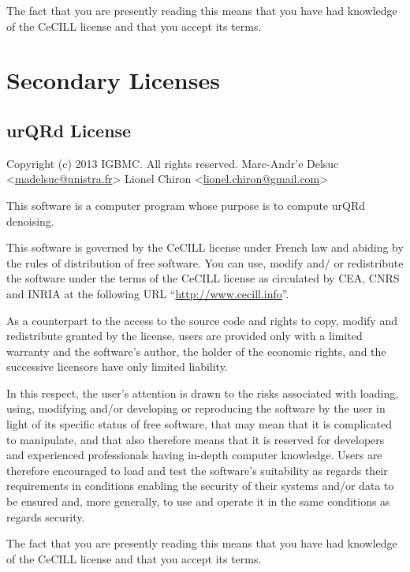 \documentclass[letterpaper,10pt,openany,oneside]{sphinxmanual}
\begin{document}
The fact that you are presently reading this means that you have had
knowledge of the CeCILL license and that you accept its terms.


\section{Secondary Licenses}
\label{rst/licenses:secondary-licenses}

\subsection{urQRd License}
\label{rst/licenses:urqrd-license}
Copyright (c) 2013 IGBMC. All rights reserved.
Marc-Andr'e Delsuc \textless{}\href{mailto:madelsuc@unistra.fr}{madelsuc@unistra.fr}\textgreater{}
Lionel Chiron \textless{}\href{mailto:lionel.chiron@gmail.com}{lionel.chiron@gmail.com}\textgreater{}

This software is a computer program whose purpose is to compute urQRd denoising.

This software is governed by the CeCILL  license under French law and
abiding by the rules of distribution of free software.  You can  use,
modify and/ or redistribute the software under the terms of the CeCILL
license as circulated by CEA, CNRS and INRIA at the following URL
``\href{http://www.cecill.info}{http://www.cecill.info}''.

As a counterpart to the access to the source code and  rights to copy,
modify and redistribute granted by the license, users are provided only
with a limited warranty  and the software's author,  the holder of the
economic rights,  and the successive licensors  have only  limited
liability.

In this respect, the user's attention is drawn to the risks associated
with loading,  using,  modifying and/or developing or reproducing the
software by the user in light of its specific status of free software,
that may mean  that it is complicated to manipulate,  and  that  also
therefore means  that it is reserved for developers  and  experienced
professionals having in-depth computer knowledge. Users are therefore
encouraged to load and test the software's suitability as regards their
requirements in conditions enabling the security of their systems and/or
data to be ensured and,  more generally, to use and operate it in the
same conditions as regards security.

The fact that you are presently reading this means that you have had
knowledge of the CeCILL license and that you accept its terms.
\end{document}
